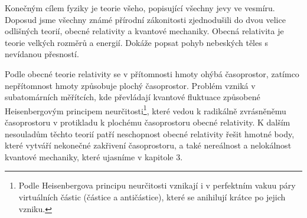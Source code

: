Konečným cílem fyziky je teorie všeho, popisující všechny jevy ve vesmíru. Doposud jsme všechny známé přírodní zákonitosti zjednodušili do dvou velice odlišných teorií, obecné relativity a kvantové mechaniky. Obecná relativita je teorie velkých rozměrů a energií. Dokáže popsat pohyb nebeských těles s nevídanou přesností.

Podle obecné teorie relativity se v přítomnosti hmoty ohýbá časoprostor, zatímco nepřítomnost hmoty způsobuje plochý časoprostor. Problém vzniká v subatomárních měřítcích, kde převládají kvantové fluktuace způsobené Heisenbergovým principem neurčitosti\footnote[2]{Podle Heisenbergova principu neurčitosti vznikají i v perfektním vakuu páry virtuálních částic (částice a antičástice), které se anihilují krátce po jejich vzniku.}, které vedou k radikálně zvrásněněmu časoprostoru v protikladu k plo\-chému časoprostoru obecné relativity. K dalším nesouladům těchto teorií patří neschopnost obecné relativity řešit hmotné body, které vytváří nekonečné zakřivení časoprostoru, a také nereálnost a nelokálnost kvantové mechaniky, které ujasníme v kapitole 3.

